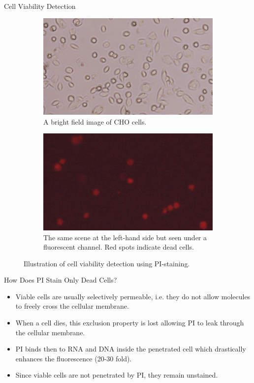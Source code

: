 \begin{frame}{Cell Viability Detection}
	\begin{figure}
		\begin{subfigure}[t]{0.49\textwidth}
			\includegraphics[width=\textwidth]{images/cells2bf}
			\caption{A bright field image of CHO cells.}
		\end{subfigure}
		\begin{subfigure}[t]{0.49\textwidth}
			\includegraphics[width=\textwidth]{images/cells2fl}
			\caption{The same scene at the left-hand side but seen under a fluorescent channel. Red spots indicate dead cells.}
		\end{subfigure}%
		\caption{Illustration of cell viability detection using PI-staining.}\label{fig:mic:cells2}
	\end{figure}
\end{frame}
\begin{frame}{How Does PI Stain Only Dead Cells?}
	\begin{itemize}
		\item<1-> Viable cells are usually selectively permeable, i.e. they do not allow molecules to freely cross the cellular membrane.
		\item<2-> When a cell dies, this exclusion property is lost allowing PI to leak through the cellular membrane.
		\item<3-> PI binds then to RNA and DNA inside the penetrated cell which drastically enhances the fluorescence (20-30 fold).
		\item<4-> Since viable cells are not penetrated by PI, they remain unstained.
	\end{itemize}
\end{frame}
